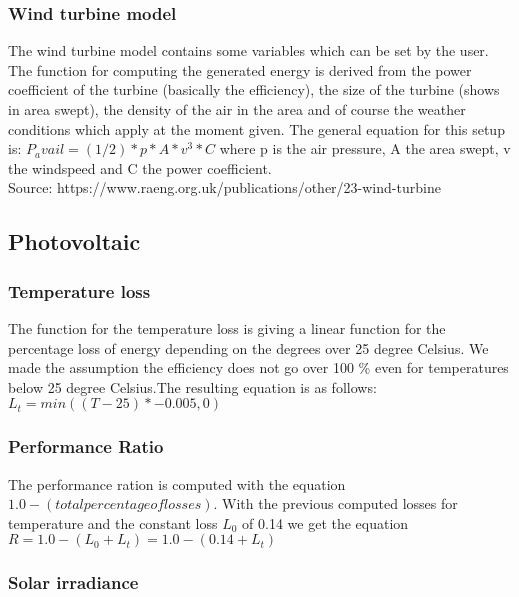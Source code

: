 \subsubsection{Wind turbine model}
The wind turbine model contains some variables which can be set by the user. The function for computing the generated energy is derived from the power coefficient of the turbine (basically the efficiency), the size of the turbine (shows in area swept), the density of the air in the area and of course the weather conditions which apply at the moment given.
The general equation for this setup is: $P_avail = (1/2) * p * A * v^{3} * C$
where p is the air pressure, A the area swept, v the windspeed and C the power coefficient.\\
Source: https://www.raeng.org.uk/publications/other/23-wind-turbine
\subsection{Photovoltaic}
\subsubsection{Temperature loss}
The function for the temperature loss is giving a linear function for the percentage loss of energy depending on the degrees over 25 degree Celsius. We made the assumption the efficiency does not go over 100 \% even for temperatures below 25 degree Celsius.The resulting equation is as follows: $L_t = min((T-25)*-0.005 , 0)$
\subsubsection{Performance Ratio}
The performance ration is computed with the equation $1.0 - (total percentage of losses)$.
With the previous computed losses for temperature and the constant loss $L_0$ of 0.14 we get the equation $R = 1.0 - (L_0 + L_t) = 1.0 - (0.14 + L_t)$
\subsubsection{Solar irradiance}